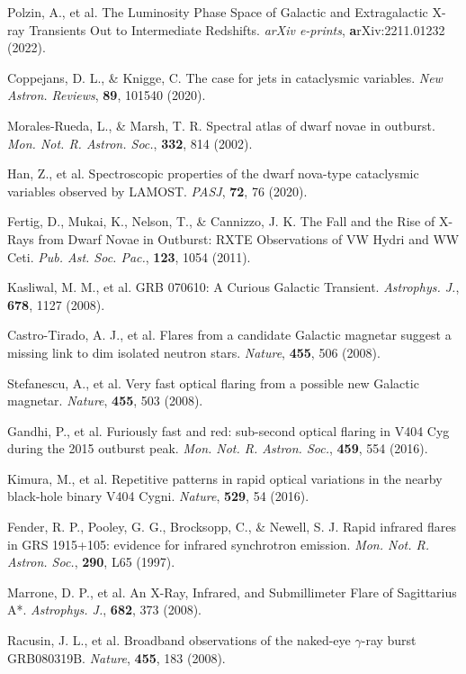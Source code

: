 \documentclass{nature_plusfigure}
\newcommand{\mn}{{Mon. Not. R. Astron. Soc.}}
\newcommand{\nar}{{New Astron. Reviews}}
\newcommand{\mnras}{\mn}
\newcommand{\apj}{{Astrophys. J.}}
\newcommand{\nat}{{Nature}}
\newcommand{\pasj}{{PASJ}}
\newcommand{\pasp}{{Pub. Ast. Soc. Pac.}}
\begin{document}
\begin{methods}
\begin{thebibliography}{10}
 Polzin, A., et al. The Luminosity Phase Space of Galactic and Extragalactic X-ray Transients Out to Intermediate Redshifts. \emph{arXiv e-prints}, \textbf arXiv:2211.01232 (2022). 

 Coppejans, D. L., \& Knigge, C. The case for jets in cataclysmic variables. \emph{\nar}, \textbf{89}, 101540 (2020). 

 Morales-Rueda, L., \& Marsh, T. R. Spectral atlas of dwarf novae in outburst. \emph{\mnras}, \textbf{332}, 814 (2002). 

 Han, Z., et al. Spectroscopic properties of the dwarf nova-type cataclysmic variables observed by LAMOST. \emph{\pasj}, \textbf{72}, 76 (2020). 

 Fertig, D., Mukai, K., Nelson, T., \& Cannizzo, J. K. The Fall and the Rise of X-Rays from Dwarf Novae in Outburst: RXTE Observations of VW Hydri and WW Ceti. \emph{\pasp}, \textbf{123}, 1054 (2011). 

 Kasliwal, M. M., et al. GRB 070610: A Curious Galactic Transient. \emph{\apj}, \textbf{678}, 1127 (2008). 

 Castro-Tirado, A. J., et al. Flares from a candidate Galactic magnetar suggest a missing link to dim isolated neutron stars. \emph{\nat}, \textbf{455}, 506 (2008). 

 Stefanescu, A., et al. Very fast optical flaring from a possible new Galactic magnetar. \emph{\nat}, \textbf{455}, 503 (2008). 

 Gandhi, P., et al. Furiously fast and red: sub-second optical flaring in V404 Cyg during the 2015 outburst peak. \emph{\mnras}, \textbf{459}, 554 (2016). 

 Kimura, M., et al. Repetitive patterns in rapid optical variations in the nearby black-hole binary V404 Cygni. \emph{\nat}, \textbf{529}, 54 (2016). 

 Fender, R. P., Pooley, G. G., Brocksopp, C., \& Newell, S. J. Rapid infrared flares in GRS 1915+105: evidence for infrared synchrotron emission. \emph{\mnras}, \textbf{290}, L65 (1997). 

 Marrone, D. P., et al. An X-Ray, Infrared, and Submillimeter Flare of Sagittarius A*. \emph{\apj}, \textbf{682}, 373 (2008). 

 Racusin, J. L., et al. Broadband observations of the naked-eye $\gamma$-ray burst GRB080319B. \emph{\nat}, \textbf{455}, 183 (2008). 


\end{thebibliography}
\end{methods}
\end{document}

